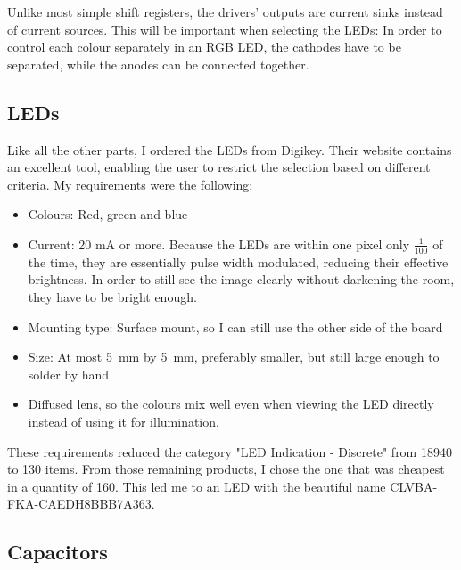 \documentclass[a4paper, 11pt, titlepage]{report}
\begin{document}
Unlike most simple shift registers, the drivers' outputs are current sinks instead of current
sources. This will be important when selecting the LEDs: In order to control each colour
separately in an RGB LED, the cathodes have to be separated, while the anodes can be connected
together.



\subsection{LEDs}

Like all the other parts, I ordered the LEDs from Digikey. Their website contains an excellent
tool, enabling the user to restrict the selection based on different criteria. My requirements
were the following:

\begin{itemize}

\item Colours: Red, green and blue

\item Current: 20 mA or more. Because the LEDs are within one pixel only $\frac{1}{100}$ of the
time, they are essentially pulse width modulated, reducing their effective brightness. In order to
still see the image clearly without darkening the room, they have to be bright enough.

\item Mounting type: Surface mount, so I can still use the other side of the board

\item Size: At most \SI{5}{\milli\meter} by \SI{5}{\milli\meter}, preferably smaller, but still
large enough to solder by hand

\item Diffused lens, so the colours mix well even when viewing the LED directly instead of using
it for illumination.

\end{itemize}

These requirements reduced the category "LED Indication - Discrete" from 18940 to 130 items.
From those remaining products, I chose the one that was cheapest in a quantity of 160. This
led me to an LED with the beautiful name CLVBA-FKA-CAEDH8BBB7A363.



\subsection{Capacitors}
\end{document}
